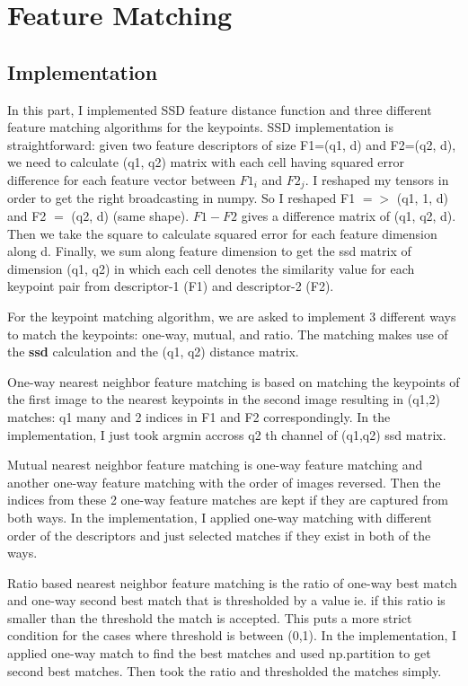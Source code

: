 \documentclass{article}
\begin{document}
\section{Feature Matching}


\subsection{Implementation}

\begin{center}
    \raggedright
    In this part, I implemented SSD feature distance function and three different feature matching algorithms for the keypoints. SSD implementation is straightforward: given two feature descriptors of size F1=(q1, d) and F2=(q2, d), we need to calculate (q1, q2) matrix with each cell having squared error difference for each feature vector between $F1_{i}$ and $F2_{j}$. I reshaped my tensors in order to get the right broadcasting in numpy. So I reshaped F1 $=>$ (q1, 1, d) and F2 $=$ (q2, d) (same shape). $F1 - F2$ gives a difference matrix of (q1, q2, d). Then we take the square to calculate squared error for each feature dimension along d. Finally, we sum along feature dimension to get the ssd matrix of dimension (q1, q2) in which each cell denotes the similarity value for each keypoint pair from descriptor-1 (F1) and descriptor-2 (F2).

    For the keypoint matching algorithm, we are asked to implement 3 different ways to match the keypoints: one-way, mutual, and ratio. The matching makes use of the \textbf{ssd} calculation and the (q1, q2) distance matrix. 
    
    One-way nearest neighbor feature matching is based on matching the keypoints of the first image to the nearest keypoints in the second image resulting in (q1,2) matches: q1 many and 2 indices in F1 and F2 correspondingly. In the implementation, I just took argmin accross q2 th channel of (q1,q2) ssd matrix.
    
    Mutual nearest neighbor feature matching is one-way feature matching and another one-way feature matching with the order of images reversed. Then the indices from these 2 one-way feature matches are kept if they are captured from both ways. In the implementation, I applied one-way matching with different order of the descriptors and just selected matches if they exist in both of the ways.

    Ratio based nearest neighbor feature matching is the ratio of one-way best match and one-way second best match that is thresholded by a value ie. if this ratio is smaller than the threshold the match is accepted. This puts a more strict condition for the cases where threshold is between (0,1). In the implementation, I applied one-way match to find the best matches and used np.partition to get second best matches. Then took the ratio and thresholded the matches simply.
    
\end{center}
\end{document}
